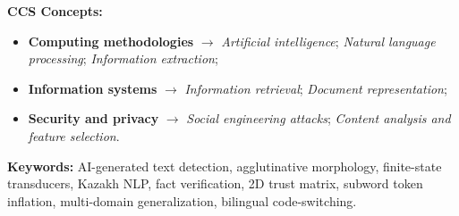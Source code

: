 \documentclass[11pt,a4paper]{article}
\begin{document}
\vspace{0.8em}
\noindent\textbf{CCS Concepts:}
\begin{itemize}
    \item \textbf{Computing methodologies} $\rightarrow$ \textit{Artificial intelligence}; \textit{Natural language processing}; \textit{Information extraction};
    \item \textbf{Information systems} $\rightarrow$ \textit{Information retrieval}; \textit{Document representation};
    \item \textbf{Security and privacy} $\rightarrow$ \textit{Social engineering attacks}; \textit{Content analysis and feature selection}.
\end{itemize}

\vspace{0.5em}
\noindent\textbf{Keywords:} AI-generated text detection, agglutinative morphology, finite-state transducers, Kazakh NLP, fact verification, 2D trust matrix, subword token inflation, multi-domain generalization, bilingual code-switching.

\vspace{1.5em}











\end{document}
